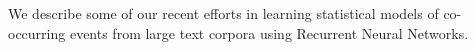 We describe some of our recent efforts in learning statistical models of co-occurring events from large text corpora using Recurrent Neural Networks.
